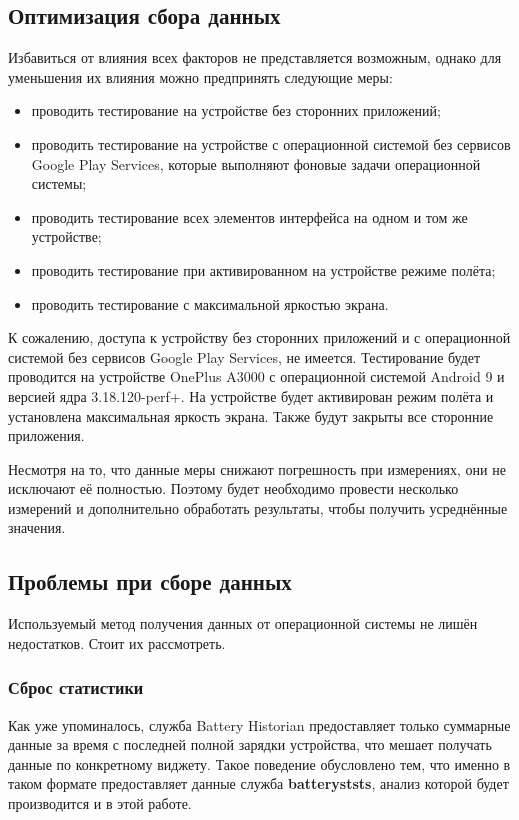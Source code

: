 \documentclass[a4paper,14pt]{extarticle} %
\begin{document}
	\subsection{Оптимизация сбора данных} \label{sub:optimization}
	
	 Избавиться от влияния всех факторов не представляется возможным, однако для уменьшения их влияния можно предпринять следующие меры:
	\begin{itemize}
		\item проводить тестирование на устройстве без сторонних приложений;
		\item проводить тестирование на устройстве с операционной системой без сервисов Google Play Services, которые выполняют фоновые задачи операционной системы;
		\item проводить тестирование всех элементов интерфейса на одном и том же устройстве;
		\item проводить тестирование при активированном на устройстве режиме полёта;
		\item проводить тестирование с максимальной яркостью экрана.
	\end{itemize}

	К сожалению, доступа к устройству без сторонних приложений и с операционной системой без сервисов Google Play Services, не имеется. Тестирование будет проводится на устройстве OnePlus A3000 с операционной системой Android 9 и версией ядра 3.18.120-perf+. На устройстве будет активирован режим полёта и установлена максимальная яркость экрана. Также будут закрыты все сторонние приложения.

	Несмотря на то, что данные меры снижают погрешность при измерениях, они не исключают её полностью. Поэтому будет необходимо провести несколько измерений и дополнительно обработать результаты, чтобы получить усреднённые значения.
	
	\subsection{Проблемы при сборе данных}
	
	Используемый метод получения данных от операционной системы не лишён недостатков. Стоит их рассмотреть.
	
	\subsubsection{Сброс статистики}
	
	Как уже упоминалось, служба Battery Historian предоставляет только суммарные данные за время с последней полной зарядки устройства, что мешает получать данные по конкретному виджету. Такое поведение обусловлено тем, что именно в таком формате предоставляет данные служба \textbf{batteryststs}, анализ которой будет производится и в этой работе.
	
\end{document}
